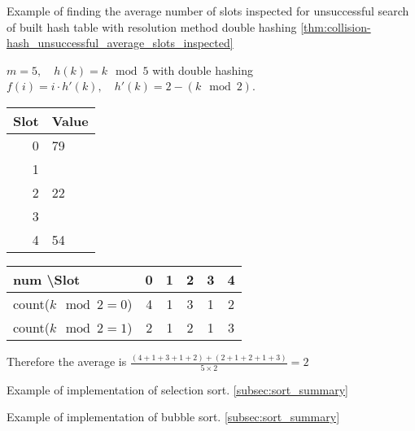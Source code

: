 \begin{example}
    \label{eg:hash_unsuccessful_double_hashing}
    Example of finding the average number of slots inspected for unsuccessful search of built hash table with resolution method double hashing \ref{thm:collision-hash_unsuccessful_average_slots_inspected}

    $m = 5,\quad h(k) = k \mod 5$ with double hashing $f(i) = i \cdot h'(k),\quad h'(k) = 2 - (k \mod 2)$.
    \begin{center}
        \begin{tabular}{|r|l|}
            \hline
            \textbf{Slot} & \textbf{Value} \\
            \hline
            0             & 79             \\
            1             &                \\
            2             & 22             \\
            3             &                \\
            4             & 54             \\
            \hline
        \end{tabular}
        \begin{tabular}{|l|ccccc|}
            \hline
            \textbf{num \textbackslash Slot} & 0 & 1 & 2 & 3 & 4 \\
            \hline
            count($k \mod 2=0$)              & 4 & 1 & 3 & 1 & 2 \\
            count($k \mod 2=1$)              & 2 & 1 & 2 & 1 & 3 \\
            \hline
        \end{tabular}
    \end{center}
    Therefore the average is $\frac{(4+1+3+1+2)+(2+1+2+1+3)}{5\times 2} = 2$
\end{example}

\begin{example}
    \label{eg:selection_sort}
    Example of implementation of selection sort. \ref{subsec:sort_summary}
\end{example}


\begin{example}
    \label{eg:bubble_sort}
    Example of implementation of bubble sort. \ref{subsec:sort_summary}
\end{example}


